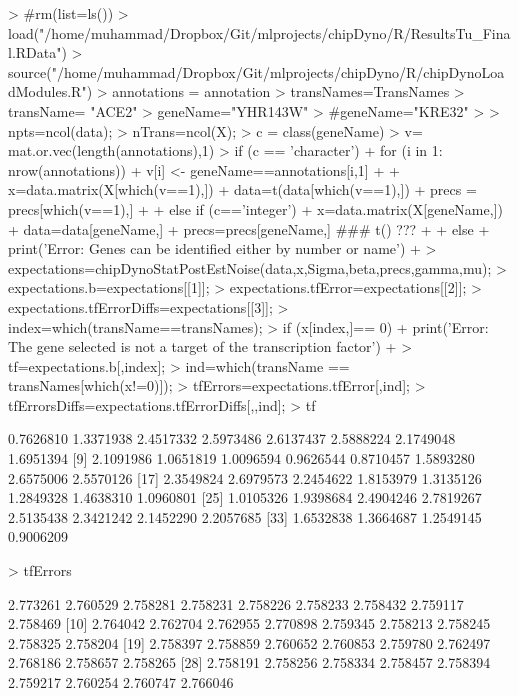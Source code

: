 \documentclass{article}
\begin{document}
\begin{Schunk}
\begin{Sinput}
> #rm(list=ls())
> load("/home/muhammad/Dropbox/Git/mlprojects/chipDyno/R/ResultsTu_Final.RData")
> source("/home/muhammad/Dropbox/Git/mlprojects/chipDyno/R/chipDynoLoadModules.R")
> annotations = annotation
> transNames=TransNames
> transName= "ACE2"
> geneName="YHR143W"
> #geneName="KRE32"
> 
> npts=ncol(data);
> nTrans=ncol(X);
> c = class(geneName)
> v= mat.or.vec(length(annotations),1)
> if (c == 'character'){
+   for (i in 1: nrow(annotations)) { 
+ 		v[i] <- geneName==annotations[i,1]
+ 		}
+ 	x=data.matrix(X[which(v==1),])
+ 	data=t(data[which(v==1),])
+ 	precs = precs[which(v==1),]
+ 
+ } else if (c=='integer'){
+ 	x=data.matrix(X[geneName,])
+ 	data=data[geneName,]
+ 	precs=precs[geneName,] ### t() ???
+ 
+ } else {
+ 	print('Error: Genes can be identified either by number or name')
+ }
> expectations=chipDynoStatPostEstNoise(data,x,Sigma,beta,precs,gamma,mu);
> expectations.b=expectations[[1]];
> expectations.tfError=expectations[[2]];
> expectations.tfErrorDiffs=expectations[[3]];
> index=which(transName==transNames);
> if (x[index,]== 0) {
+  print('Error: The gene selected is not a target of the transcription factor')
+ }
> tf=expectations.b[,index];
> ind=which(transName == transNames[which(x!=0)]);
> tfErrors=expectations.tfError[,ind];
> tfErrorsDiffs=expectations.tfErrorDiffs[,,ind];
> tf
\end{Sinput}
\begin{Soutput}
 [1] 0.7626810 1.3371938 2.4517332 2.5973486 2.6137437 2.5888224 2.1749048 1.6951394
 [9] 2.1091986 1.0651819 1.0096594 0.9626544 0.8710457 1.5893280 2.6575006 2.5570126
[17] 2.3549824 2.6979573 2.2454622 1.8153979 1.3135126 1.2849328 1.4638310 1.0960801
[25] 1.0105326 1.9398684 2.4904246 2.7819267 2.5135438 2.3421242 2.1452290 2.2057685
[33] 1.6532838 1.3664687 1.2549145 0.9006209
\end{Soutput}
\begin{Sinput}
> tfErrors
\end{Sinput}
\begin{Soutput}
 [1] 2.773261 2.760529 2.758281 2.758231 2.758226 2.758233 2.758432 2.759117 2.758469
[10] 2.764042 2.762704 2.762955 2.770898 2.759345 2.758213 2.758245 2.758325 2.758204
[19] 2.758397 2.758859 2.760652 2.760853 2.759780 2.762497 2.768186 2.758657 2.758265
[28] 2.758191 2.758256 2.758334 2.758457 2.758394 2.759217 2.760254 2.760747 2.766046
\end{Soutput}
\end{Schunk}
\end{document}
